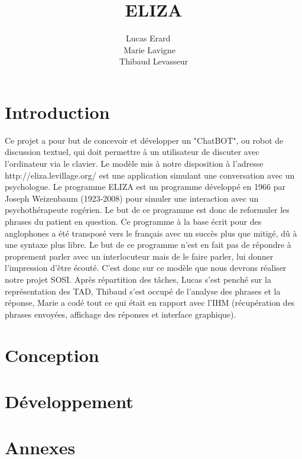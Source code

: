 \documentclass[a4paper,12pt]{article}
\title{ELIZA}
\author{Lucas Erard ~~\\ Marie Lavigne~~\\ Thibaud Levasseur}
\begin{document}
\maketitle
\newpage
\tableofcontents
\newpage
\section{Introduction}
Ce projet a pour but de concevoir et développer un "ChatBOT", ou robot de discussion textuel, qui doit permettre à un utilisateur de discuter avec l'ordinateur via le clavier. Le modèle mis à notre disposition à l'adresse http://eliza.levillage.org/ est une application simulant une conversation avec un psychologue.
Le programme ELIZA est un programme développé en 1966 par Joseph Weizenbaum (1923-2008) pour simuler une interaction avec un psychothérapeute rogérien. Le but de ce programme est donc de reformuler les phrases du patient en question.
Ce programme à la base écrit pour des anglophones a été transposé vers le français avec un succès  plus que mitigé, dû à une syntaxe plus libre.
Le but de ce programme n'est en fait pas de répondre à proprement parler avec un interlocuteur mais de le faire parler, lui donner l'impression d'être écouté.
C'est donc sur ce modèle que nous devrons réaliser notre projet SOSI.
Après répartition des tâches, Lucas s'est penché sur la représentation des TAD, Thibaud s'est occupé de l'analyse des phrases et la réponse, Marie a codé tout ce qui était en rapport avec l'IHM (récupération des phrases envoyées, affichage des réponses et interface graphique).
\section{Conception}

\section{Développement}

\section{Annexes}
\end{document}
